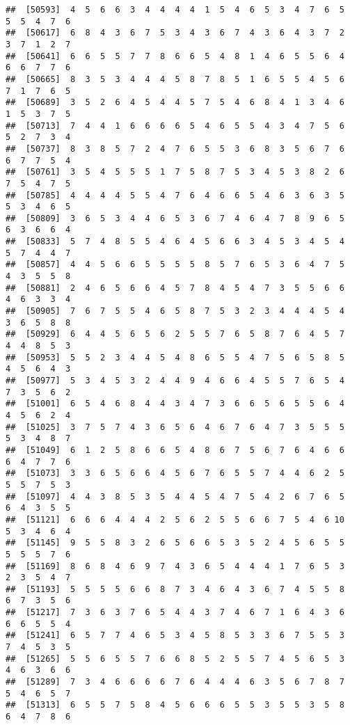 \documentclass[
]{book}
\begin{document}
\begin{verbatim}
##  [50593]  4  5  6  6  3  4  4  4  4  1  5  4  6  5  3  4  7  6  5  5  5  4  7  6
##  [50617]  6  8  4  3  6  7  5  3  4  3  6  7  4  3  6  4  3  7  2  3  7  1  2  7
##  [50641]  6  6  5  5  7  7  8  6  6  5  4  8  1  4  6  5  5  6  4  6  6  7  7  6
##  [50665]  8  3  5  3  4  4  4  5  8  7  8  5  1  6  5  5  4  5  6  7  1  7  6  5
##  [50689]  3  5  2  6  4  5  4  4  5  7  5  4  6  8  4  1  3  4  6  1  5  3  7  5
##  [50713]  7  4  4  1  6  6  6  6  5  4  6  5  5  4  3  4  7  5  6  5  2  7  3  4
##  [50737]  8  3  8  5  7  2  4  7  6  5  5  3  6  8  3  5  6  7  6  6  7  7  5  4
##  [50761]  3  5  4  5  5  5  1  7  5  8  7  5  3  4  5  3  8  2  6  7  5  4  7  5
##  [50785]  4  4  4  4  5  5  4  7  6  4  6  6  5  4  6  3  6  3  5  5  3  4  6  5
##  [50809]  3  6  5  3  4  4  6  5  3  6  7  4  6  4  7  8  9  6  5  6  3  6  6  4
##  [50833]  5  7  4  8  5  5  4  6  4  5  6  6  3  4  5  3  4  5  4  5  7  4  4  7
##  [50857]  4  4  5  6  6  5  5  5  5  8  5  7  6  5  3  6  4  7  5  4  3  5  5  8
##  [50881]  2  4  6  5  6  6  4  5  7  8  4  5  4  7  3  5  5  6  6  4  6  3  3  4
##  [50905]  7  6  7  5  5  4  6  5  8  7  5  3  2  3  4  4  4  5  4  3  6  5  8  8
##  [50929]  6  4  4  5  6  5  6  2  5  5  7  6  5  8  7  6  4  5  7  4  4  8  5  3
##  [50953]  5  5  2  3  4  4  5  4  8  6  5  5  4  7  5  6  5  8  5  4  5  6  4  3
##  [50977]  5  3  4  5  3  2  4  4  9  4  6  6  4  5  5  7  6  5  4  7  3  5  6  2
##  [51001]  6  5  4  6  8  4  4  3  4  7  3  6  6  5  6  5  5  6  4  4  5  6  2  4
##  [51025]  3  7  5  7  4  3  6  5  6  4  6  7  6  4  7  3  5  5  5  5  3  4  8  7
##  [51049]  6  1  2  5  8  6  6  5  4  8  6  7  5  6  7  6  4  6  6  6  4  7  7  6
##  [51073]  3  3  6  5  6  6  4  5  6  7  6  5  5  7  4  4  6  2  5  5  5  7  5  3
##  [51097]  4  4  3  8  5  3  5  4  4  5  4  7  5  4  2  6  7  6  5  6  4  3  5  5
##  [51121]  6  6  6  4  4  4  2  5  6  2  5  5  6  6  7  5  4  6 10  5  3  4  6  4
##  [51145]  9  5  5  8  3  2  6  5  6  6  5  3  5  2  4  5  6  5  5  5  5  5  7  6
##  [51169]  8  6  8  4  6  9  7  4  3  6  5  4  4  4  1  7  6  5  3  2  3  5  4  7
##  [51193]  5  5  5  5  6  6  8  7  3  4  6  4  3  6  7  4  5  5  8  6  7  3  5  6
##  [51217]  7  3  6  3  7  6  5  4  4  3  7  4  6  7  1  6  4  3  6  6  6  5  5  4
##  [51241]  6  5  7  7  4  6  5  3  4  5  8  5  3  3  6  7  5  5  3  7  4  5  3  5
##  [51265]  5  5  6  5  5  7  6  6  8  5  2  5  5  7  4  5  6  5  3  4  6  3  6  6
##  [51289]  7  3  4  6  6  6  6  7  6  4  4  4  6  3  5  6  7  8  7  5  4  6  5  7
##  [51313]  6  5  5  7  5  8  4  5  6  6  6  5  5  3  5  5  3  5  8  6  4  7  8  6

\end{verbatim}
\end{document}
